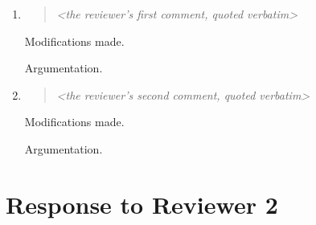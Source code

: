 \documentclass[conference,onecolumn,a4paper]{IEEEtran}
\newif\ifguidance
\newcommand{\guidance}[1]{\ifguidance{\itshape\small #1\par\medskip}\fi}
\begin{document}
\begin{enumerate}

\item
\begin{quote}\itshape
<the reviewer's first comment, quoted verbatim>
\end{quote}

Modifications made.
\guidance{What you changed and where: the section, and the sentence or the
table. A reviewer should find it without re-reading the paper. If nothing
changed, write ``no change''.}

Argumentation.
\guidance{Why that change, or why that refusal. Disagreeing is allowed and
scores well when argued. Conceding every point scores the same as ignoring
them all.

Weigh a refusal. Repairing the defects your reviewers found is marked in the
paper itself, so a point you decline that the instructor judges well founded
stays there as a defect and is marked there. A refusal earns its marks when
the argument holds.

Argue with the point.}

\item
\begin{quote}\itshape
<the reviewer's second comment, quoted verbatim>
\end{quote}

Modifications made.

Argumentation.

\end{enumerate}

\guidance{And so on, one block per comment, to the end of the review.}

\section*{Response to Reviewer 2}

\guidance{Same structure as above.}
\end{document}
